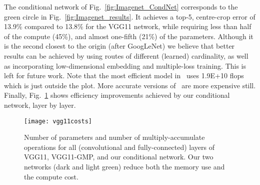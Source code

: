 \documentclass[thesis]{subfiles}
\begin{document}
	The conditional network of Fig.~\ref{fig:Imagenet_CondNet} 
	corresponds to the green circle in Fig.~\ref{fig:Imagenet_results}.
	It achieves a top-5, centre-crop error of
	13.9\% compared to 13.8\% for the VGG11 network, while requiring less than half of the compute (45\%),
	and almost one-fifth (21\%) of the parameters.
	Although it is the second closest to the origin (after GoogLeNet) we believe that better results can be achieved 
	by using routes of different (learned) cardinality, as well as incorporating low-dimensional embedding and multiple-loss training. This is left for future work. 
	Note that the most efficient model in~\citep{He2015b} uses 1.9E+10 flops which is just outside the plot. 
	More accurate versions of~\citep{He2015b} are more expensive still.
	Finally, Fig.~\ref{fig:VggPerLayerCost} shows efficiency improvements achieved by our conditional network, layer by layer.
	
	\begin{figure}[tbp]
		\centering
		\texttt{[image: vgg11costs]}
		\caption[Cost of VGG11-based networks per layer]{
			Number of parameters and number of multiply-accumulate operations for all (convolutional and fully-connected) 
			layers of VGG11, VGG11-GMP, and our conditional network. Our two networks (dark and light green) 
			reduce both the memory use and the compute cost.}
		\label{fig:VggPerLayerCost}
	\end{figure}
	
	
	
	
	
	
\end{document}
